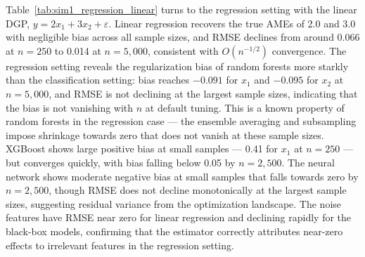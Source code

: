 \documentclass[12pt,a4paper]{article}
\numberwithin{equation}{section}
\theoremstyle{plain}
\theoremstyle{definition}
\begin{document}
	Table~\ref{tab:sim1_regression_linear} turns to the regression setting with the linear DGP, $y = 2x_1 + 3x_2 + \varepsilon$. Linear regression recovers the true AMEs of 2.0 and 3.0 with negligible bias across all sample sizes, and RMSE declines from around 0.066 at $n=250$ to 0.014 at $n=5{,}000$, consistent with $O(n^{-1/2})$ convergence. The regression setting reveals the regularization bias of random forests more starkly than the classification setting: bias reaches $-0.091$ for $x_1$ and $-0.095$ for $x_2$ at $n=5{,}000$, and RMSE is not declining at the largest sample sizes, indicating that the bias is not vanishing with $n$ at default tuning. This is a known property of random forests in the regression case --- the ensemble averaging and subsampling impose shrinkage towards zero that does not vanish at these sample sizes. XGBoost shows large positive bias at small samples --- 0.41 for $x_1$ at $n=250$ --- but converges quickly, with bias falling below 0.05 by $n=2{,}500$. The neural network shows moderate negative bias at small samples that falls towards zero by $n=2{,}500$, though RMSE does not decline monotonically at the largest sample sizes, suggesting residual variance from the optimization landscape. The noise features have RMSE near zero for linear regression and declining rapidly for the black-box models, confirming that the estimator correctly attributes near-zero effects to irrelevant features in the regression setting.
	
\end{document}
